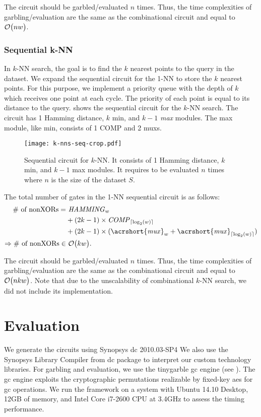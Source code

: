 The circuit should be garbled/evaluated $n$ times.
Thus, the time complexities of garbling/evaluation are the same as the combinational circuit and equal to $\mathcal{O}\bigl(nw\bigr)$.

\subsubsection{Sequential k-NN}
In $k$-NN search, the goal is to find the $k$ nearest points to the query in the dataset.
We expand the sequential circuit for the 1-NN to store the $k$ nearest points.
For this purpose, we implement a priority queue with the depth of $k$ which receives one point at each cycle.
The priority of each point is equal to its distance to the query.
 shows the sequential circuit for the $k$-NN search.
The circuit has 1 Hamming distance, $k$ min, and $k-1$ \emph{max} modules.
The max module, like min, consists of 1 COMP and 2 \acrshort{mux}s.

\begin{figure}
\centering
\texttt{[image: k-nns-seq-crop.pdf]}
\caption{Sequential circuit for $k$-NN.
It consists of 1 Hamming distance, $k$ min, and $k-1$ max modules.
It requires to be evaluated $n$ times where $n$ is the size of the dataset $S$.}
\label{fig:k-nns-seq}
\end{figure}

The total number of gates in the 1-NN sequential circuit is as follows:
\begin{align*}
\text{\# of nonXORs}=			& ~ \mathit{HAMMING}_{w}\\
								& + (2k-1) \times \mathit{COMP}_{\lceil \log _2(w) \rceil} \\
								& + (2k-1) \times (\mathit{\acrshort{mux}}_w  + \mathit{\acrshort{mux}}_{\lceil \log _2(w) \rceil})\\
\Rightarrow \text{\# of nonXORs} \in & ~ \BigO{kw}.
\end{align*}

The circuit should be garbled/evaluated $n$ times.
Thus, the time complexities of garbling/evaluation are the same as the combinational circuit and equal to $\mathcal{O}\bigl(nkw\bigr)$.
Note that due to the unscalability of combinational $k$-NN search, we did not include its implementation.

\section{Evaluation}\label{sec:knn-eval}
We generate the circuits using Synopsys \acrfull{dc} 2010.03-SP4
We also use the Synopsys Library Compiler from \acrshort{dc} package to interpret our custom technology libraries.
For garbling and evaluation, we use the \gls{tinygarble} \acrshort{gc} engine (see ).
The \acrshort{gc} engine exploits the cryptographic permutations realizable by fixed-key \acrshort{aes} for \acrshort{gc} operations.
We run the framework on a system with Ubuntu 14.10 Desktop, 12GB of memory, and Intel Core i7-2600 CPU at 3.4GHz to assess the timing performance.

